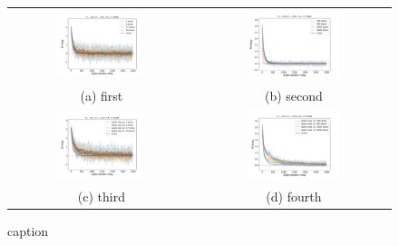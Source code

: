 \documentclass[12pt, a4paper,  nobibnotes]{article}
\begin{document}
\begin{figure}[H]
    \centering
    \begin{tabular}{cc}
      \includegraphics[width=0.5\textwidth]{figures/BH-stoch-L=6-t=-0_5-U=-0_5-lr=0_001-shots=5-50.pdf} &   \includegraphics[width=0.5\textwidth]{figures/BH-stoch-L=6-t=-0_5-U=-0_5-lr=0_001-shots=100-5000.pdf} \\
    (a) first & (b) second \\[6pt]
     \includegraphics[width=0.5\textwidth]{figures/BH-doublystoch-bs=12-L=6-t=-0_5-U=-0_5-lr=0_001-shots=5-50.pdf} &   \includegraphics[width=0.5\textwidth]{figures/BH-doublystoch-bs=12-L=6-t=-0_5-U=-0_5-lr=0_001-shots=100-5000.pdf} \\
    (c) third & (d) fourth \\[6pt]
    \end{tabular}
    \caption{caption}
\end{figure}
\end{document}
